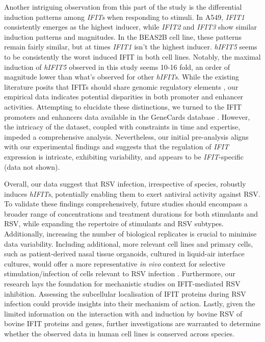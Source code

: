 Another intriguing observation from this part of the study is the differential induction patterns among \textit{IFITs} when responding to stimuli. In A549, \textit{IFIT1} consistently emerges as the highest inducer, while \textit{IFIT2} and \textit{IFIT3} show similar induction patterns and magnitudes. In the BEAS2B cell line, these patterns remain fairly similar, but at times \textit{IFIT1} isn't the highest inducer. \textit{hIFIT5} seems to be consistently the worst induced IFIT in both cell lines. Notably, the maximal induction of \textit{hIFIT5} observed in this study seems 10-16 fold, an order of magnitude lower than what's observed for other \textit{hIFITs}. While the existing literature posits that IFITs should share genomic regulatory elements \cite{Lou2009IFR-9/STAT2STAT1}, our empirical data indicates potential disparities in both promoter and enhancer activities. Attempting to elucidate these distinctions, we turned to the IFIT promoters and enhancers data available in the GeneCards database \cite{Stelzer2016TheAnalyses, Fishilevich2017GeneHancer:GeneCards}. However, the intricacy of the dataset, coupled with constraints in time and expertise, impeded a comprehensive analysis. Nevertheless, our initial pre-analysis aligns with our experimental findings and suggests that the regulation of \textit{IFIT} expression is intricate, exhibiting variability, and appears to be \textit{IFIT}-specific (data not shown).

Overall, our data suggest that RSV infection, irrespective of species, robustly induces \textit{hIFITs}, potentially enabling them to exert antiviral activity against RSV. To validate these findings comprehensively, future studies should encompass a broader range of concentrations and treatment durations for both stimulants and RSV, while expanding the repertoire of stimulants and RSV subtypes. Additionally, increasing the number of biological replicates is crucial to minimise data variability. Including additional, more relevant cell lines and primary cells, such as patient-derived nasal tissue organoids, cultured in liquid-air interface cultures, would offer a more representative \textit{in vivo} context for selective stimulation/infection of cells relevant to RSV infection \cite{Michi2021ACells, Rajan2022TheTherapeutics}. Furthermore, our research lays the foundation for mechanistic studies on IFIT-mediated RSV inhibition. Assessing the subcellular localisation of IFIT proteins during RSV infection could provide insights into their mechanism of action. Lastly, given the limited information on the interaction with and induction by bovine RSV of bovine IFIT proteins and genes, further investigations are warranted to determine whether the observed data in human cell lines is conserved across species.

